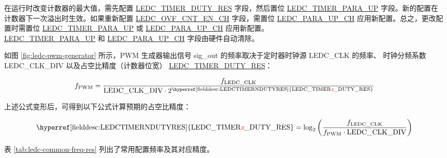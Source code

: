 \documentclass[main\_\_CN.tex]{subfiles}
\begin{document}
在运行时改变计数器的最大值，需先配置 \hyperref[fielddesc:LEDCTIMERNDUTYRES]{LEDC\_TIMER\_DUTY\_RES} 字段，然后置位 \hyperref[fielddesc:LEDCTIMERNPARAUP]{LEDC\_TIMER\_PARA\_UP} 字段。新的配置在计数器下一次溢出时生效。如果重新配置 \hyperref[fielddesc:LEDCOVFCNTENCHN]{LEDC\_OVF\_CNT\_EN\_CH} 字段，需置位 \hyperref[fielddesc:LEDCPARAUPCHN]{LEDC\_PARA\_UP\_CH} 应用新配置。总之，更改配置时需置位 \hyperref[fielddesc:LEDCTIMERNPARAUP]{LEDC\_TIMER\_PARA\_UP} 或 \hyperref[fielddesc:LEDCPARAUPCHN]{LEDC\_PARA\_UP\_CH} 应用新配置。\\\hyperref[fielddesc:LEDCTIMERNPARAUP]{LEDC\_TIMER\_PARA\_UP} 和 \hyperref[fielddesc:LEDCPARAUPCHN]{LEDC\_PARA\_UP\_CH} 字段由硬件自动清除。

如图 \ref{fig:ledc-pwm-generator} 所示，PWM 生成器输出信号 sig\_out 的频率取决于定时器时钟源 LEDC\_CLK 的频率、 时钟分频系数 LEDC\_CLK\_DIV 以及占空比精度（计数器位宽） \hyperref[fielddesc:LEDCTIMERNDUTYRES]{LEDC\_TIMER\_DUTY\_RES}：

    \[
    f_{\textrm{PWM}}=\frac{f_{\textrm{LEDC\_CLK}}}
                        {\textrm{LEDC\_CLK\_DIV}\cdot 2^{\textrm{\hyperref[fielddesc:LEDCTIMERNDUTYRES]{LEDC\_TIMER\regindex{x}\_DUTY\_RES}}}}
    \]

上述公式变形后，可得到以下公式计算预期的占空比精度：

    \[
    \textrm{\hyperref[fielddesc:LEDCTIMERNDUTYRES]{LEDC\_TIMER\regindex{x}\_DUTY\_RES}}
    =\log_2\left(\frac{f_{\textrm{LEDC\_CLK}}}
    {f_{\textrm{PWM}}\cdot \textrm{LEDC\_CLK\_DIV}}\right)
    \]


表 \ref{tab:ledc-common-freq-res} 列出了常用配置频率及其对应精度。
\end{document}
